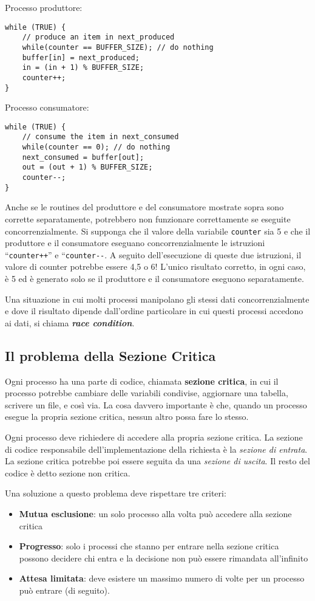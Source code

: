 \documentclass[a4]{article}
\begin{document}
Processo produttore:
\begin{verbatim}
while (TRUE) {
    // produce an item in next_produced
    while(counter == BUFFER_SIZE); // do nothing
    buffer[in] = next_produced;
    in = (in + 1) % BUFFER_SIZE;
    counter++;
}
\end{verbatim}

Processo consumatore:
\begin{verbatim}
while (TRUE) {
    // consume the item in next_consumed
    while(counter == 0); // do nothing
    next_consumed = buffer[out];
    out = (out + 1) % BUFFER_SIZE;
    counter--;
}
\end{verbatim}

Anche se le routines del produttore e del consumatore mostrate sopra sono corrette separatamente, potrebbero non funzionare correttamente se eseguite concorrenzialmente. Si supponga che il valore della variabile \texttt{counter} sia 5 e che il produttore e il consumatore eseguano concorrenzialmente le istruzioni ``\texttt{counter++}'' e ``\texttt{counter-{}-}. A seguito dell'esecuzione di queste due istruzioni, il valore di counter potrebbe essere 4,5 o 6! L'unico risultato corretto, in ogni caso, è 5 ed è generato solo se il produttore e il consumatore eseguono separatamente.

Una situazione in cui molti processi manipolano gli stessi dati concorrenzialmente e dove il risultato dipende dall'ordine particolare in cui questi processi accedono ai dati, si chiama \textit{\textbf{race condition}}.

\subsection{Il problema della Sezione Critica}
Ogni processo ha una parte di codice, chiamata \textbf{sezione critica}, in cui il processo potrebbe cambiare delle variabili condivise, aggiornare una tabella, scrivere un file, e così via. La cosa davvero importante è che, quando un processo esegue la propria sezione critica, nessun altro possa fare lo stesso.

Ogni processo deve richiedere di accedere alla propria sezione critica. La sezione di codice responsabile dell'implementazione della richiesta è la \textit{sezione di entrata}. La sezione critica potrebbe poi essere seguita da una \textit{sezione di uscita}. Il resto del codice è detto sezione non critica.

Una soluzione a questo problema deve rispettare tre criteri:
\begin{itemize}
    \item \textbf{Mutua esclusione}: un solo processo alla volta può accedere alla sezione critica
    \item \textbf{Progresso}: solo i processi che stanno per entrare nella sezione critica possono decidere chi entra e la decisione non può essere rimandata all'infinito
    \item \textbf{Attesa limitata}: deve esistere un massimo numero di volte per un processo può entrare (di seguito).
\end{itemize}
\end{document}
